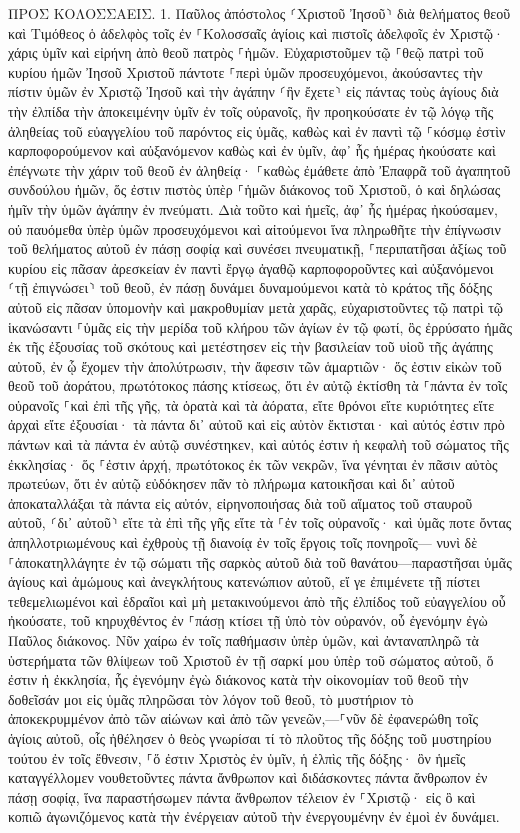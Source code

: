 \documentclass[twoside, 9pt]{extreport}
\begin{document}
ΠΡΟΣ ΚΟΛΟΣΣΑΕΙΣ.
1.
Παῦλος ἀπόστολος ⸂Χριστοῦ Ἰησοῦ⸃ διὰ θελήματος θεοῦ καὶ Τιμόθεος ὁ ἀδελφὸς 
τοῖς ἐν ⸀Κολοσσαῖς ἁγίοις καὶ πιστοῖς ἀδελφοῖς ἐν Χριστῷ· χάρις ὑμῖν καὶ εἰρήνη ἀπὸ θεοῦ πατρὸς ⸀ἡμῶν. 
Εὐχαριστοῦμεν τῷ ⸀θεῷ πατρὶ τοῦ κυρίου ἡμῶν Ἰησοῦ Χριστοῦ πάντοτε ⸀περὶ ὑμῶν προσευχόμενοι, 
ἀκούσαντες τὴν πίστιν ὑμῶν ἐν Χριστῷ Ἰησοῦ καὶ τὴν ἀγάπην ⸂ἣν ἔχετε⸃ εἰς πάντας τοὺς ἁγίους 
διὰ τὴν ἐλπίδα τὴν ἀποκειμένην ὑμῖν ἐν τοῖς οὐρανοῖς, ἣν προηκούσατε ἐν τῷ λόγῳ τῆς ἀληθείας τοῦ εὐαγγελίου 
τοῦ παρόντος εἰς ὑμᾶς, καθὼς καὶ ἐν παντὶ τῷ ⸀κόσμῳ ἐστὶν καρποφορούμενον καὶ αὐξανόμενον καθὼς καὶ ἐν ὑμῖν, ἀφ᾽ ἧς ἡμέρας ἠκούσατε καὶ ἐπέγνωτε τὴν χάριν τοῦ θεοῦ ἐν ἀληθείᾳ· 
⸀καθὼς ἐμάθετε ἀπὸ Ἐπαφρᾶ τοῦ ἀγαπητοῦ συνδούλου ἡμῶν, ὅς ἐστιν πιστὸς ὑπὲρ ⸀ἡμῶν διάκονος τοῦ Χριστοῦ, 
ὁ καὶ δηλώσας ἡμῖν τὴν ὑμῶν ἀγάπην ἐν πνεύματι. 
Διὰ τοῦτο καὶ ἡμεῖς, ἀφ᾽ ἧς ἡμέρας ἠκούσαμεν, οὐ παυόμεθα ὑπὲρ ὑμῶν προσευχόμενοι καὶ αἰτούμενοι ἵνα πληρωθῆτε τὴν ἐπίγνωσιν τοῦ θελήματος αὐτοῦ ἐν πάσῃ σοφίᾳ καὶ συνέσει πνευματικῇ, 
⸀περιπατῆσαι ἀξίως τοῦ κυρίου εἰς πᾶσαν ἀρεσκείαν ἐν παντὶ ἔργῳ ἀγαθῷ καρποφοροῦντες καὶ αὐξανόμενοι ⸂τῇ ἐπιγνώσει⸃ τοῦ θεοῦ, 
ἐν πάσῃ δυνάμει δυναμούμενοι κατὰ τὸ κράτος τῆς δόξης αὐτοῦ εἰς πᾶσαν ὑπομονὴν καὶ μακροθυμίαν μετὰ χαρᾶς, 
εὐχαριστοῦντες τῷ πατρὶ τῷ ἱκανώσαντι ⸀ὑμᾶς εἰς τὴν μερίδα τοῦ κλήρου τῶν ἁγίων ἐν τῷ φωτί, 
ὃς ἐρρύσατο ἡμᾶς ἐκ τῆς ἐξουσίας τοῦ σκότους καὶ μετέστησεν εἰς τὴν βασιλείαν τοῦ υἱοῦ τῆς ἀγάπης αὐτοῦ, 
ἐν ᾧ ἔχομεν τὴν ἀπολύτρωσιν, τὴν ἄφεσιν τῶν ἁμαρτιῶν· 
ὅς ἐστιν εἰκὼν τοῦ θεοῦ τοῦ ἀοράτου, πρωτότοκος πάσης κτίσεως, 
ὅτι ἐν αὐτῷ ἐκτίσθη τὰ ⸀πάντα ἐν τοῖς οὐρανοῖς ⸀καὶ ἐπὶ τῆς γῆς, τὰ ὁρατὰ καὶ τὰ ἀόρατα, εἴτε θρόνοι εἴτε κυριότητες εἴτε ἀρχαὶ εἴτε ἐξουσίαι· τὰ πάντα δι᾽ αὐτοῦ καὶ εἰς αὐτὸν ἔκτισται· 
καὶ αὐτός ἐστιν πρὸ πάντων καὶ τὰ πάντα ἐν αὐτῷ συνέστηκεν, 
καὶ αὐτός ἐστιν ἡ κεφαλὴ τοῦ σώματος τῆς ἐκκλησίας· ὅς ⸀ἐστιν ἀρχή, πρωτότοκος ἐκ τῶν νεκρῶν, ἵνα γένηται ἐν πᾶσιν αὐτὸς πρωτεύων, 
ὅτι ἐν αὐτῷ εὐδόκησεν πᾶν τὸ πλήρωμα κατοικῆσαι 
καὶ δι᾽ αὐτοῦ ἀποκαταλλάξαι τὰ πάντα εἰς αὐτόν, εἰρηνοποιήσας διὰ τοῦ αἵματος τοῦ σταυροῦ αὐτοῦ, ⸂δι᾽ αὐτοῦ⸃ εἴτε τὰ ἐπὶ τῆς γῆς εἴτε τὰ ⸀ἐν τοῖς οὐρανοῖς· 
καὶ ὑμᾶς ποτε ὄντας ἀπηλλοτριωμένους καὶ ἐχθροὺς τῇ διανοίᾳ ἐν τοῖς ἔργοις τοῖς πονηροῖς— 
νυνὶ δὲ ⸀ἀποκατηλλάγητε ἐν τῷ σώματι τῆς σαρκὸς αὐτοῦ διὰ τοῦ θανάτου—παραστῆσαι ὑμᾶς ἁγίους καὶ ἀμώμους καὶ ἀνεγκλήτους κατενώπιον αὐτοῦ, 
εἴ γε ἐπιμένετε τῇ πίστει τεθεμελιωμένοι καὶ ἑδραῖοι καὶ μὴ μετακινούμενοι ἀπὸ τῆς ἐλπίδος τοῦ εὐαγγελίου οὗ ἠκούσατε, τοῦ κηρυχθέντος ἐν ⸀πάσῃ κτίσει τῇ ὑπὸ τὸν οὐρανόν, οὗ ἐγενόμην ἐγὼ Παῦλος διάκονος. 
Νῦν χαίρω ἐν τοῖς παθήμασιν ὑπὲρ ὑμῶν, καὶ ἀνταναπληρῶ τὰ ὑστερήματα τῶν θλίψεων τοῦ Χριστοῦ ἐν τῇ σαρκί μου ὑπὲρ τοῦ σώματος αὐτοῦ, ὅ ἐστιν ἡ ἐκκλησία, 
ἧς ἐγενόμην ἐγὼ διάκονος κατὰ τὴν οἰκονομίαν τοῦ θεοῦ τὴν δοθεῖσάν μοι εἰς ὑμᾶς πληρῶσαι τὸν λόγον τοῦ θεοῦ, 
τὸ μυστήριον τὸ ἀποκεκρυμμένον ἀπὸ τῶν αἰώνων καὶ ἀπὸ τῶν γενεῶν,—⸀νῦν δὲ ἐφανερώθη τοῖς ἁγίοις αὐτοῦ, 
οἷς ἠθέλησεν ὁ θεὸς γνωρίσαι τί τὸ πλοῦτος τῆς δόξης τοῦ μυστηρίου τούτου ἐν τοῖς ἔθνεσιν, ⸀ὅ ἐστιν Χριστὸς ἐν ὑμῖν, ἡ ἐλπὶς τῆς δόξης· 
ὃν ἡμεῖς καταγγέλλομεν νουθετοῦντες πάντα ἄνθρωπον καὶ διδάσκοντες πάντα ἄνθρωπον ἐν πάσῃ σοφίᾳ, ἵνα παραστήσωμεν πάντα ἄνθρωπον τέλειον ἐν ⸀Χριστῷ· 
εἰς ὃ καὶ κοπιῶ ἀγωνιζόμενος κατὰ τὴν ἐνέργειαν αὐτοῦ τὴν ἐνεργουμένην ἐν ἐμοὶ ἐν δυνάμει. 
\end{document}
